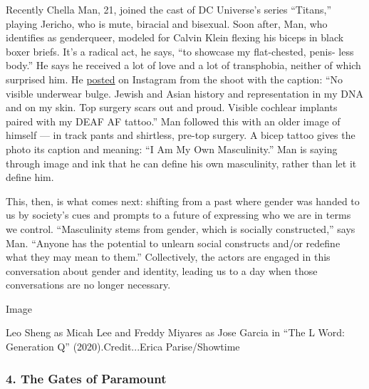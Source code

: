 Recently Chella Man, 21, joined the cast of DC Universe's series
``Titans,'' playing Jericho, who is mute, biracial and bisexual. Soon
after, Man, who identifies as genderqueer, modeled for Calvin Klein
flexing his biceps in black boxer briefs. It's a radical act, he says,
``to showcase my flat-chested, penis- less body.'' He says he received a
lot of love and a lot of transphobia, neither of which surprised him. He
\href{https://www.instagram.com/p/B2Z7egEHLaZ/}{posted} on Instagram
from the shoot with the caption: ``No visible underwear bulge. Jewish
and Asian history and representation in my DNA and on my skin. Top
surgery scars out and proud. Visible cochlear implants paired with my
DEAF AF tattoo.'' Man followed this with an older image of himself ---
in track pants and shirtless, pre-top surgery. A bicep tattoo gives the
photo its caption and meaning: ``I Am My Own Masculinity.'' Man is
saying through image and ink that he can define his own masculinity,
rather than let it define him.

This, then, is what comes next: shifting from a past where gender was
handed to us by society's cues and prompts to a future of expressing who
we are in terms we control. ``Masculinity stems from gender, which is
socially constructed,'' says Man. ``Anyone has the potential to unlearn
social constructs and/or redefine what they may mean to them.''
Collectively, the actors are engaged in this conversation about gender
and identity, leading us to a day when those conversations are no longer
necessary.

Image

Leo Sheng as Micah Lee and Freddy Miyares as Jose Garcia in ``The L
Word: Generation Q'' (2020).Credit...Erica Parise/Showtime

\hypertarget{4-the-gates-of-paramount}{%
\subsubsection{4. The Gates of
Paramount}\label{4-the-gates-of-paramount}}

